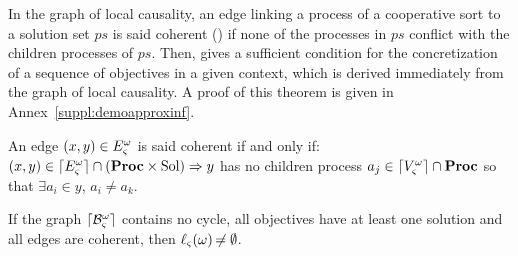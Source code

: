 \begin{comment}
\pref{eq:Vw}, \eqref{eq:Vproc} and \eqref{eq:VE} ensure that all required nodes are in $\cwV$.
Elements in $\PHproc$ are required processes,
elements in $\Obj$ are the objectives to reach these processes
and elements in $\Sol$ are the sets of processes that allow to solve these objectives.
\pref{eq:ESol1} links an objective $P$ to its solutions in $\BS(P)$
and \pref{eq:ESol2} links a solution $ps$ to the processes $a_i \in ps$ it contains.
Then, \pref{eq:EReq} links a required component process $a_i$ to all objectives $\PHobjp{a}{j}{i}$ with $a_j \in \ctx$
while \pref{eq:EPrio} links a required cooperative sort process $a_i$ to its solutions in $\csState(a_i)$.
Finally, if the resolution of an objective $P$ requires a process of $\PHsort(P)$, then \pref{eq:ECont} re-targets this objective ($\gCont$).
\end{comment}




In the graph of local causality, an edge linking a process of a cooperative sort to a solution set $ps$ is said coherent () if none of the processes in $ps$ conflict with the children processes of $ps$.
Then,  gives a sufficient condition for the concretization of a sequence of objectives in a given context,
which is derived immediately from the graph of local causality.
A proof of this theorem is given in Annex~\ref{suppl:demoapproxinf}.
\begin{definition}
\label{def:coherent}
  An edge $(x, y) \in E_\varsigma^\omega$ is said coherent if and only if:
  $(x, y) \in \lceil E_\varsigma^\omega\rceil \cap (\mathbf{Proc} \times \mathrm{Sol}) \Rightarrow y$ has no children process $a_j \in \lceil V_\varsigma^\omega\rceil \cap \mathbf{Proc}$ so that $\exists a_i \in y$, $a_i \neq a_k$.
\end{definition}

\begin{theorem}
\label{th:approxinf}
  If the graph $\lceil \mathcal{B}_\varsigma^\omega\rceil$ contains no cycle,
  all objectives have at least one solution
  and all edges are coherent,
  then $\ell_\varsigma(\omega) \not\nobreak\mkern -2mu = \emptyset$.
\end{theorem}




